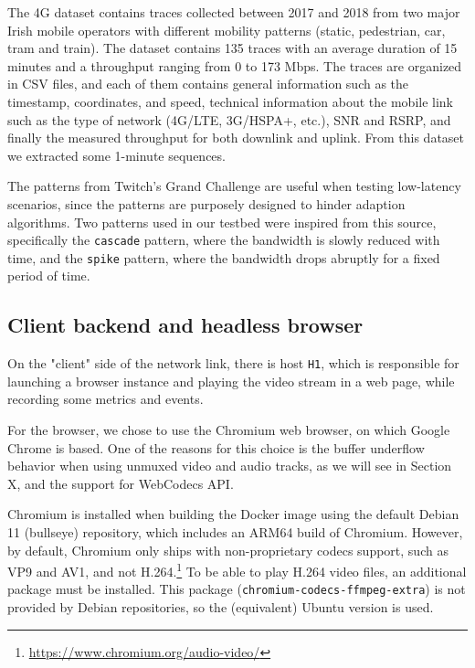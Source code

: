 The 4G dataset contains traces collected between 2017 and 2018 from two major Irish mobile operators with different mobility patterns (static, pedestrian, car, tram and train). The dataset contains 135 traces with an average duration of 15 minutes and a throughput ranging from 0 to 173 Mbps. The traces are organized in CSV files, and each of them contains general information such as the timestamp, coordinates, and speed, technical information about the mobile link such as the type of network (4G/LTE, 3G/HSPA+, etc.), SNR and RSRP, and finally the measured throughput for both downlink and uplink. From this dataset we extracted some 1-minute sequences. %

The patterns from Twitch's Grand Challenge are useful when testing low-latency scenarios, since the patterns are purposely designed to hinder adaption algorithms. Two patterns used in our testbed were inspired from this source, specifically the \texttt{cascade} pattern, where the bandwidth is slowly reduced with time, and the \texttt{spike} pattern, where the bandwidth drops abruptly for a fixed period of time.

\subsection{Client backend and headless browser}
\label{sec:eval/testbed/backend}

On the "client" side of the network link, there is host \texttt{H1}, which is responsible for launching a browser instance and playing the video stream in a web page, while recording some metrics and events.

For the browser, we chose to use the Chromium web browser, on which Google Chrome is based. One of the reasons for this choice is the buffer underflow behavior when using unmuxed video and audio tracks, as we will see in Section X, and the support for WebCodecs API.

Chromium is installed when building the Docker image using the default Debian 11 (bullseye) repository, which includes an ARM64 build of Chromium. However, by default, Chromium only ships with non-proprietary codecs support, such as VP9 and AV1, and not H.264.\footnote{\url{https://www.chromium.org/audio-video/}} To be able to play H.264 video files, an additional package must be installed. This package (\texttt{chromium-codecs-ffmpeg-extra}) is not provided by Debian repositories, so the (equivalent) Ubuntu version is used.

